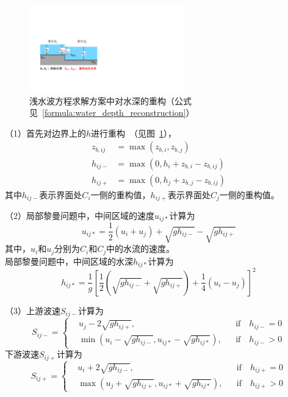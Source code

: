 {
\begin{figure}[htbp]
\centering
\includegraphics[width=0.6\textwidth]{Figures/侧向流/水深重构.pdf}
\caption{浅水波方程求解方案中对水深的重构（公式见~\ref{formula:water_depth_reconstruction}）}
\label{fig:水深重构}
\end{figure}
}

（1）首先对边界上的$h$进行重构~\citep{audusse2004scientificcomputing}（见图~\ref{fig:水深重构}），
\begin{equation} \label{formula:water_depth_reconstruction}
\begin{aligned}
z_{b,ij} & = \max\left(z_{b,i}, z_{b,j}\right) \\
h_{ij-} & =  \max\left(0, h_i + z_{b,i} - z_{b,ij} \right) \\
h_{ij+} & =  \max\left(0, h_j + z_{b,j} - z_{b,ij} \right)
\end{aligned}
\end{equation}
其中$h_{ij-}$表示界面处$C_i$一侧的重构值，$h_{ij+}$表示界面处$C_j$一侧的重构值。

（2）局部黎曼问题中，中间区域的速度$u_{ij*}$计算为
	\begin{equation}
		u_{ij*} = \frac{1}{2}\left(u_i + u_j\right) + \sqrt{g h_{ij-}} - \sqrt{g h_{ij+}}
	\end{equation}
其中，$u_i$和$u_j$分别为$C_i$和$C_j$中的水流的速度。 \\
局部黎曼问题中，中间区域的水深$h_{ij*}$计算为
	\begin{equation}
		h_{ij*} = \frac{1}{g}\left[\frac{1}{2}\left(\sqrt{g h_{ij-}} + \sqrt{g h_{ij+}}\right) + \frac{1}{4}\left(u_i - u_j\right)\right]^2
	\end{equation}

（3）上游波速$S_{ij-}$计算为
	\begin{equation}
		S_{ij-} = \left\{
		\begin{aligned}
			&u_j - 2\sqrt{gh_{ij+}}, && \mbox{if} \quad h_{ij-} = 0 \\
			& \min \left(u_i - \sqrt{gh_{ij-}}, u_{ij*} - \sqrt{gh_{ij*}}\right), && \mbox{if} \quad h_{ij-} > 0
		\end{aligned}\right.
	\end{equation}
下游波速$S_{ij+}$计算为
	\begin{equation}
		S_{ij+} = \left\{
		\begin{aligned}
			&u_i + 2\sqrt{gh_{ij-}}, && \mbox{if} \quad h_{ij+} = 0 \\
			& \max \left(u_j + \sqrt{gh_{ij+}}, u_{ij*} + \sqrt{gh_{ij*}}\right), && \mbox{if} \quad h_{ij+} > 0
		\end{aligned}\right.
	\end{equation}

